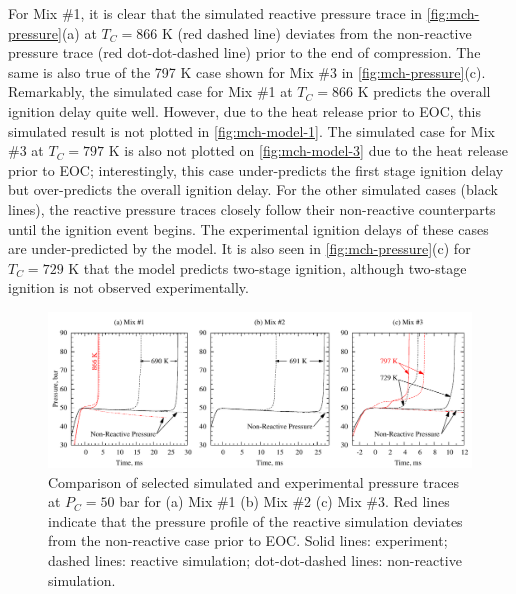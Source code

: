 \documentclass[12pt, letterpaper]{article}
\begin{document}
For Mix \#1, it is clear that the simulated reactive pressure trace in
\autoref{fig:mch-pressure}(a) at $T_C=866$ K (red dashed line) deviates from
the non-reactive pressure trace (red dot-dot-dashed line) prior to the end of
compression. The same is also true of the 797 K case shown for Mix \#3 in
\autoref{fig:mch-pressure}(c). Remarkably, the simulated case for Mix \#1 at
$T_C=866$ K predicts the overall ignition delay quite well. However, due to the
heat release prior to EOC, this simulated result is not plotted in
\autoref{fig:mch-model-1}. The simulated case for Mix \#3 at $T_C=797$ K is also
not plotted on \autoref{fig:mch-model-3} due to the heat release prior to EOC;
interestingly, this case under-predicts the first stage ignition delay but
over-predicts the overall ignition delay. For the other simulated cases (black
lines), the reactive pressure traces closely follow their non-reactive
counterparts until the ignition event begins. The experimental ignition delays
of these cases are under-predicted by the model. It is also seen in
\autoref{fig:mch-pressure}(c) for $T_C=729$ K that the model predicts two-stage
ignition, although two-stage ignition is not observed experimentally.

\begin{figure}
    \centering
    \includegraphics[width=\textwidth]{../figures/05-MCH/mch-pressure}
    \caption{Comparison of selected simulated and experimental pressure traces
        at $P_C=50$ bar for (a) Mix \#1 (b) Mix \#2 (c) Mix \#3. Red lines
        indicate that the pressure profile of the reactive simulation deviates
        from the non-reactive case prior to EOC. Solid lines: experiment;
        dashed lines: reactive simulation; dot-dot-dashed lines: non-reactive
        simulation.}
    \label{fig:mch-pressure}
\end{figure}
\end{document}
